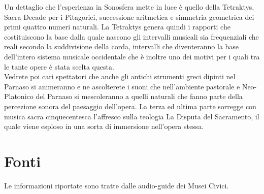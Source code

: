 \documentclass[hidelinks,12pt,a4paper]{article}
\begin{document}
\begin{flushleft}
			Un dettaglio che l'esperienza in Sonosfera mette in luce è quello della Tetraktys, Sacra Decade per i Pitagorici, successione aritmetica e simmetria geometrica dei primi quattro numeri naturali. La Tetraktys genera quindi i rapporti che costituiscono la base dalla quale nascono gli intervalli musicali sia frequenziali che reali secondo la suddivisione della corda, intervalli che diventeranno la base dell'intero sistema musicale occidentale che è inoltre uno dei motivi per i quali tra le tante opere è stata scelta questa.\\
			Vedrete poi cari spettatori che anche gli antichi strumenti greci dipinti nel Parnaso si animeranno e ne ascolterete i suoni che nell'ambiente pastorale e Neo-Platonico del Parnaso si mescoleranno a quelli naturali che fanno parte della percezione sonora del paesaggio dell'opera. La terza ed ultima parte sorregge con musica sacra cinquecentesca l'affresco sulla teologia La Disputa del Sacramento, il quale viene esploso in una sorta di immersione nell'opera stessa.
			
			\section{Fonti}
			Le informazioni riportate sono tratte dalle audio-guide dei Musei Civici.
	
			\vspace*{\fill}
			\doclicenseThis
		\end{flushleft}
\end{document}
